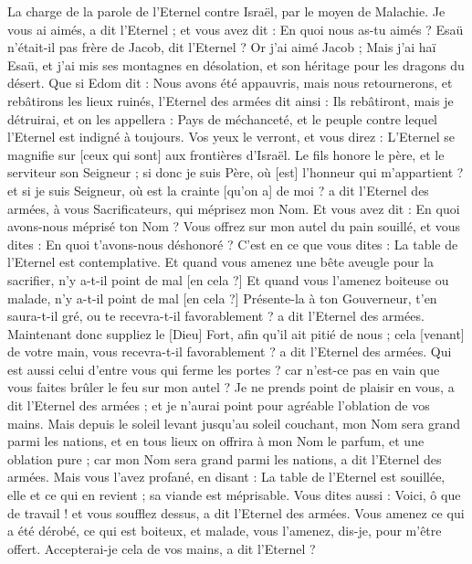 \BFont
\begin{multicols}{2}
\VerseOne{}La charge de la parole de l'Eternel contre Israël, par le moyen de Malachie.
Je vous ai aimés, a dit l'Eternel ; et vous avez dit : En quoi nous as-tu aimés ? Esaü n'était-il pas frère de Jacob, dit l'Eternel ? Or j'ai aimé Jacob ;
Mais j'ai haï Esaü, et j'ai mis ses montagnes en désolation, et son héritage pour les dragons du désert.
Que si Edom dit : Nous avons été appauvris, mais nous retournerons, et rebâtirons les lieux ruinés, l'Eternel des armées dit ainsi : Ils rebâtiront, mais je détruirai, et on les appellera : Pays de méchanceté, et le peuple contre lequel l'Eternel est indigné à toujours.
Vos yeux le verront, et vous direz : L'Eternel se magnifie sur [ceux qui sont] aux frontières d'Israël.
Le fils honore le père, et le serviteur son Seigneur ; si donc je suis Père, où [est] l'honneur qui m'appartient ? et si je suis Seigneur, où est la crainte [qu'on a] de moi ? a dit l'Eternel des armées, à vous Sacrificateurs, qui méprisez mon Nom. Et vous avez dit : En quoi avons-nous méprisé ton Nom ?
Vous offrez sur mon autel du pain souillé, et vous dites : En quoi t'avons-nous déshonoré ? C'est en ce que vous dites : La table de l'Eternel est contemplative.
Et quand vous amenez une bête aveugle pour la sacrifier, n'y a-t-il point de mal [en cela ?] Et quand vous l'amenez boiteuse ou malade, n'y a-t-il point de mal [en cela ?] Présente-la à ton Gouverneur, t'en saura-t-il gré, ou te recevra-t-il favorablement ? a dit l'Eternel des armées.
Maintenant donc suppliez le [Dieu] Fort, afin qu'il ait pitié de nous ; cela [venant] de votre main, vous recevra-t-il favorablement ? a dit l'Eternel des armées.
Qui est aussi celui d'entre vous qui ferme les portes ? car n'est-ce pas en vain que vous faites brûler le feu sur mon autel ? Je ne prends point de plaisir en vous, a dit l'Eternel des armées ; et je n'aurai point pour agréable l'oblation de vos mains.
Mais depuis le soleil levant jusqu'au soleil couchant, mon Nom sera grand parmi les nations, et en tous lieux on offrira à mon Nom le parfum, et une oblation pure ; car mon Nom sera grand parmi les nations, a dit l'Eternel des armées.
Mais vous l'avez profané, en disant : La table de l'Eternel est souillée, elle et ce qui en revient ; sa viande est méprisable.
Vous dites aussi : Voici, ô que de travail ! et vous soufflez dessus, a dit l'Eternel des armées. Vous amenez ce qui a été dérobé, ce qui est boiteux, et malade, vous l'amenez, dis-je, pour m'être offert. Accepterai-je cela de vos mains, a dit l'Eternel ?

\end{multicols}
